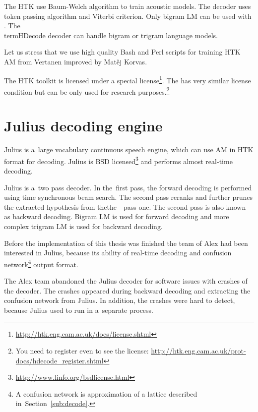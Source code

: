{The \ac{HTK} use Baum-Welch algorithm to train acoustic models.
The  decoder uses token passing algorithm and Viterbi criterion.\cite{young2006htk} %
Only bigram \ac{LM} can be used with .
The \\term{HDecode} decoder can handle bigram or trigram language models. 


Let us stress that we use high quality Bash and Perl scripts for training \ac{HTK} \ac{AM} from Vertanen improved by Matěj Korvas.\cite{vertanen_baseline_2006}\cite{korvas_2014}

The \ac{HTK} toolkit is licensed under a special license\footnote{\url{http://htk.eng.cam.ac.uk/docs/license.shtml}}.
The  has very similar license condition but can be only used for research purposes.\footnote{You need to register even to see the license: \url{http://htk.eng.cam.ac.uk/prot-docs/hdecode_register.shtml}}

\section{Julius decoding engine}
\label{sec:back_julius}

Julius is a~large vocabulary continuous speech engine, which can use \ac{AM} in \ac{HTK} format for decoding.\cite{lee2009julius}
Julius is BSD licensed\footnote{\url{http://www.linfo.org/bsdlicense.html}} and performs almost real-time decoding.

Julius is a~two pass decoder. 
In the~first pass, the forward decoding is performed using time synchronous beam search.
The second pass reranks and further prunes the extracted hypothesis from thethe~~pass one.
The second pass is also known as backward decoding.
Bigram \ac{LM} is used for forward decoding and more complex trigram \ac{LM} is used for backward decoding.

Before the implementation of this thesis was finished the team of Alex had been interested in Julius, because its ability of real-time decoding and confusion network\footnote{A confusion network is approximation of a lattice described in~Section~\ref{sub:decode}.} output format.

The Alex team abandoned the Julius decoder for software issues with crashes of the decoder. 
The crashes appeared during backward decoding and extracting the confusion network from Julius. 
In addition, the crashes were hard to detect, because Julius used to run in a~separate process.

}
